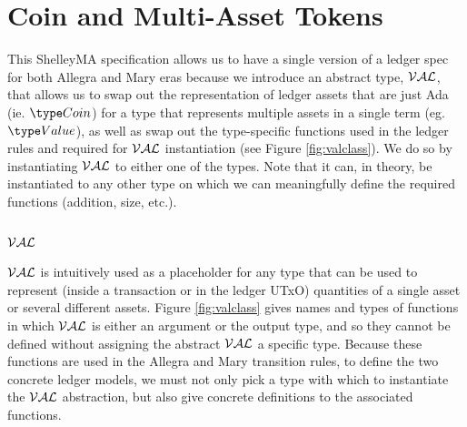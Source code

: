 \section{Coin and Multi-Asset Tokens}
\label{sec:coin-ma}

This ShelleyMA specification allows us to have a single version of a ledger
spec for both Allegra and Mary eras because we introduce an abstract type,
$\mathcal{VAL}$, that allows us to swap out the representation of ledger assets that
are just Ada (ie. $\Coin$) for a type that represents multiple assets in a
single term (eg. $\Value$), as well as swap out the type-specific functions
used in the ledger rules and required for $\mathcal{VAL}$ instantiation (see Figure \ref{fig:valclass}).
We do so by instantiating $\mathcal{VAL}$ to either one of the types. Note that
it can, in theory, be instantiated to any other type on which we can meaningfully
define the required functions (addition, size, etc.).

\subsection{$\mathcal{VAL}$}

$\mathcal{VAL}$ is intuitively used as a placeholder for any type that can be used
to represent (inside a transaction or in the ledger UTxO) quantities of a single asset or several different assets.
Figure \ref{fig:valclass} gives names and types of functions in which $\mathcal{VAL}$ is either
an argument or the output type, and so they cannot be defined without assigning
the abstract $\mathcal{VAL}$ a specific type. Because these functions are used in the
Allegra and Mary transition rules, to define the two concrete ledger models,
we must not only pick a type with which to instantiate the $\mathcal{VAL}$ abstraction,
but also give concrete definitions to the associated functions.


